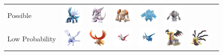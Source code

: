 \documentclass[8pt,aspectratio=169,compress]{beamer}
\begin{document}
\begin{frame}
\begin{block}{}
\begin{tiny}
\begin{tabular}{lccccccc}
Possible
& \includegraphics[width=1cm]{../../images/pokemon/dialga.png}
& \includegraphics[width=1cm]{../../images/pokemon/palkia.png}
& \includegraphics[width=1cm]{../../images/pokemon/regirock.png}
& \includegraphics[width=1cm]{../../images/pokemon/regice.png}
& \includegraphics[width=1cm]{../../images/pokemon/registeel.png}\\
Low Probability
& \includegraphics[width=1cm]{../../images/pokemon/lugia.png}
& \includegraphics[width=1cm]{../../images/pokemon/ho-oh.png}
& \includegraphics[width=1cm]{../../images/pokemon/latias.png}
& \includegraphics[width=1cm]{../../images/pokemon/latios.png}
& \includegraphics[width=1cm]{../../images/pokemon/giratina_a.png}
& \includegraphics[width=1cm]{../../images/pokemon/giratina_o.png}\\

\end{tabular}
\end{tiny}
\end{block}
\end{frame}
\end{document}
